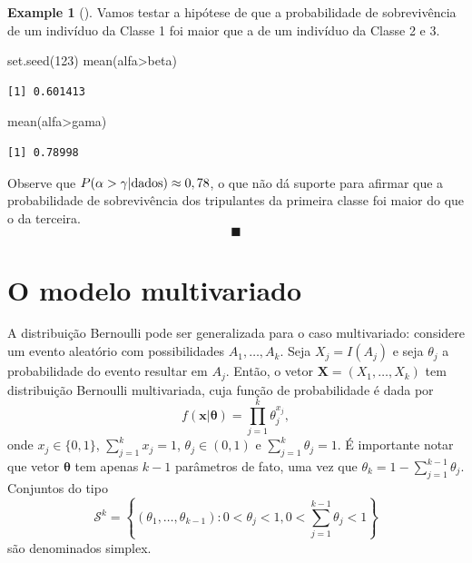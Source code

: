 \documentclass[
  letterpaper,
  DIV=11,
  numbers=noendperiod]{scrreprt}
\newenvironment{Shaded}{\begin{snugshade}}{\end{snugshade}}
\newcommand{\DecValTok}[1]{\textcolor[rgb]{0.68,0.00,0.00}{#1}}
\newcommand{\FunctionTok}[1]{\textcolor[rgb]{0.28,0.35,0.67}{#1}}
\newcommand{\NormalTok}[1]{\textcolor[rgb]{0.00,0.23,0.31}{#1}}
\newcommand{\SpecialCharTok}[1]{\textcolor[rgb]{0.37,0.37,0.37}{#1}}
\theoremstyle{definition}
\newtheorem{example}{Example}[chapter]
\theoremstyle{plain}
\theoremstyle{definition}
\theoremstyle{remark}
\begin{document}
\begin{example}[]
Vamos testar a hipótese de que a probabilidade de sobrevivência de um
indivíduo da Classe 1 foi maior que a de um indivíduo da Classe 2 e 3.

\begin{Shaded}
\begin{Highlighting}[]
\FunctionTok{set.seed}\NormalTok{(}\DecValTok{123}\NormalTok{)}
\FunctionTok{mean}\NormalTok{(alfa}\SpecialCharTok{\textgreater{}}\NormalTok{beta)}
\end{Highlighting}
\end{Shaded}

\begin{verbatim}
[1] 0.601413
\end{verbatim}

\begin{Shaded}
\begin{Highlighting}[]
\FunctionTok{mean}\NormalTok{(alfa}\SpecialCharTok{\textgreater{}}\NormalTok{gama)}
\end{Highlighting}
\end{Shaded}

\begin{verbatim}
[1] 0.78998
\end{verbatim}

Observe que \(P(\alpha>\gamma|\hbox{dados})\approx 0,78\), o que não dá
suporte para afirmar que a probabilidade de sobrevivência dos
tripulantes da primeira classe foi maior do que o da terceira.
\[\blacksquare\]

\end{example}

\section{O modelo multivariado}\label{o-modelo-multivariado}

A distribuição Bernoulli pode ser generalizada para o caso multivariado:
considere um evento aleatório com possibilidades \(A_1,\ldots,A_k\).
Seja \(X_j=I(A_j)\) e seja \(\theta_j\) a probabilidade do evento
resultar em \(A_j\). Então, o vetor \(\boldsymbol{X}=(X_1,\ldots,X_k)\)
tem distribuição Bernoulli multivariada, cuja função de probabilidade é
dada por
\[f(\boldsymbol{x}|\boldsymbol{\theta})=\prod_{j=1}^k\theta_j^{x_{j}},\]
onde \(x_j\in\{0,1\}\), \(\sum_{j=1}^kx_j=1\), \(\theta_j\in(0,1)\) e
\(\sum_{j=1}^k\theta_j=1\). É importante notar que vetor
\(\boldsymbol{\theta}\) tem apenas \(k-1\) parâmetros de fato, uma vez
que \(\theta_k=1-\sum_{j=1}^{k-1}\theta_j\). Conjuntos do tipo
\[\mathcal{S}^k=\left\{(\theta_1,\ldots,\theta_{k-1}):0<\theta_j<1,0<\sum_{j=1}^{k-1}\theta_j<1\right\}\]
são denominados simplex.
\end{document}
